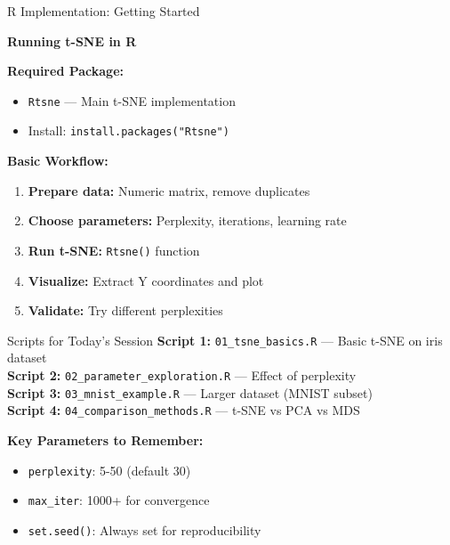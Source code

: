 \documentclass[10pt]{beamer}
\begin{document}
\begin{frame}{R Implementation: Getting Started}

\begin{center}
\textbf{\Large Running t-SNE in R}
\end{center}

\vspace{0.2cm}
\textbf{Required Package:}
\begin{itemize}
    \item \texttt{Rtsne} — Main t-SNE implementation
    \item Install: \texttt{install.packages("Rtsne")}
\end{itemize}

\vspace{0.2cm}
\textbf{Basic Workflow:}
\begin{enumerate}
    \setlength\itemsep{0em}
    \item \textbf{Prepare data:} Numeric matrix, remove duplicates
    \item \textbf{Choose parameters:} Perplexity, iterations, learning rate
    \item \textbf{Run t-SNE:} \texttt{Rtsne()} function
    \item \textbf{Visualize:} Extract Y coordinates and plot
    \item \textbf{Validate:} Try different perplexities
\end{enumerate}

\vspace{0.2cm}
\begin{exampleblock}{Scripts for Today's Session}
\footnotesize
\textbf{Script 1:} \texttt{01\_tsne\_basics.R} — Basic t-SNE on iris dataset\\
\textbf{Script 2:} \texttt{02\_parameter\_exploration.R} — Effect of perplexity\\
\textbf{Script 3:} \texttt{03\_mnist\_example.R} — Larger dataset (MNIST subset)\\
\textbf{Script 4:} \texttt{04\_comparison\_methods.R} — t-SNE vs PCA vs MDS
\end{exampleblock}

\vspace{0.15cm}
\textbf{Key Parameters to Remember:}
\begin{itemize}
    \setlength\itemsep{0em}
    \item \texttt{perplexity}: 5-50 (default 30)
    \item \texttt{max\_iter}: 1000+ for convergence
    \item \texttt{set.seed()}: Always set for reproducibility
\end{itemize}

\end{frame}
\end{document}

